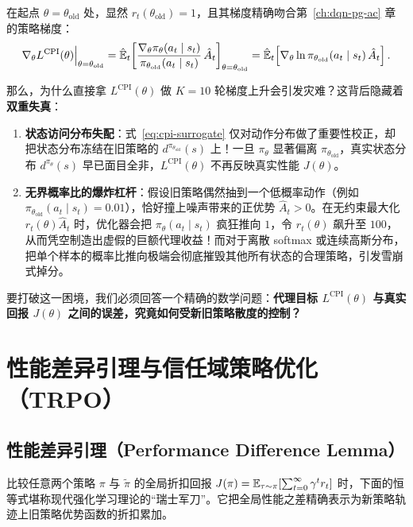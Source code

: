 在起点 $\theta = \theta_{\mathrm{old}}$ 处，显然 $r_t(\theta_{\mathrm{old}}) = 1$，且其梯度精确吻合第~\ref{ch:dqn-pg-ac} 章的策略梯度：
\[
  \nabla_\theta L^{\mathrm{CPI}}(\theta)\Big|_{\theta=\theta_{\mathrm{old}}}
  = \hat{\mathbb{E}}_t\!\left[\frac{\nabla_\theta \pi_\theta(a_t \mid s_t)}{\pi_{\theta_{\mathrm{old}}}(a_t \mid s_t)}\,\hat{A}_t\right]_{\theta=\theta_{\mathrm{old}}}
  = \hat{\mathbb{E}}_t\!\left[\nabla_\theta \ln \pi_{\theta_{\mathrm{old}}}(a_t \mid s_t)\,\hat{A}_t\right].
\]

那么，为什么直接拿 $L^{\mathrm{CPI}}(\theta)$ 做 $K=10$ 轮梯度上升会引发灾难？这背后隐藏着\textbf{双重失真}：
\begin{enumerate}
  \item \textbf{状态访问分布失配}：式~\eqref{eq:cpi-surrogate} 仅对动作分布做了重要性校正，却把状态分布冻结在旧策略的 $d^{\pi_{\theta_{\mathrm{old}}}}(s)$ 上！一旦 $\pi_\theta$ 显著偏离 $\pi_{\theta_{\mathrm{old}}}$，真实状态分布 $d^{\pi_\theta}(s)$ 早已面目全非，$L^{\mathrm{CPI}}(\theta)$ 不再反映真实性能 $J(\theta)$。
  \item \textbf{无界概率比的爆炸杠杆}：假设旧策略偶然抽到一个低概率动作（例如 $\pi_{\theta_{\mathrm{old}}}(a_t \mid s_t) = 0.01$），恰好撞上噪声带来的正优势 $\hat{A}_t > 0$。在无约束最大化 $r_t(\theta)\hat{A}_t$ 时，优化器会把 $\pi_\theta(a_t \mid s_t)$ 疯狂推向 $1$，令 $r_t(\theta)$ 飙升至 $100$，从而凭空制造出虚假的巨额代理收益！而对于离散 softmax 或连续高斯分布，把单个样本的概率比推向极端会彻底摧毁其他所有状态的合理策略，引发雪崩式掉分。
\end{enumerate}

要打破这一困境，我们必须回答一个精确的数学问题：\textbf{代理目标 $L^{\mathrm{CPI}}(\theta)$ 与真实回报 $J(\theta)$ 之间的误差，究竟如何受新旧策略散度的控制？}

\section{性能差异引理与信任域策略优化（TRPO）}
\label{sec:trpo}

\subsection{性能差异引理（Performance Difference Lemma）}

比较任意两个策略 $\pi$ 与 $\tilde{\pi}$ 的全局折扣回报 $J(\pi) = \mathbb{E}_{\tau \sim \pi}[\sum_{t=0}^\infty \gamma^t r_t]$ 时，下面的恒等式堪称现代强化学习理论的“瑞士军刀”。它把全局性能之差精确表示为新策略轨迹上旧策略优势函数的折扣累加。

